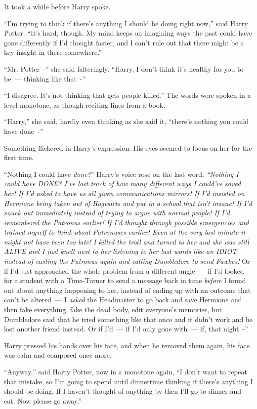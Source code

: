It took a while before Harry spoke.

``I'm trying to think if there's anything I should be doing right now,'' said Harry Potter. ``It's hard, though. My mind keeps on imagining ways the past could have gone differently if I'd thought faster, and I can't rule out that there might be a key insight in there somewhere.''

``Mr. Potter~-'' she said falteringly. ``Harry, I don't think it's healthy for you to be~--- thinking like that~-''

``I disagree. It's not thinking that gets people killed.'' The words were spoken in a level monotone, as though reciting lines from a book.

``Harry,'' she said, hardly even thinking as she said it, ``there's nothing you could have done~-''

Something flickered in Harry's expression. His eyes seemed to focus on her for the first time.

``Nothing I could have \emph{done?}'' Harry's voice rose on the last word. \emph{``Nothing I could have DONE? I've lost track of how many different ways I could've saved her! If I'd asked to have us all given communications mirrors! If I'd insisted on Hermione being taken out of Hogwarts and put in a school that isn't insane! If I'd snuck out immediately instead of trying to argue with normal people! If I'd remembered the Patronus earlier! If I'd thought through possible emergencies and trained myself to think about Patronuses earlier! Even at the very last minute it might not have been too late! I killed the troll and turned to her and she was still ALIVE and I just knelt next to her listening to her last words like an IDIOT instead of casting the Patronus again and calling Dumbledore to send Fawkes!} Or if I'd just approached the whole problem from a different angle~--- if I'd looked for a student with a Time-Turner to send a message back in time \emph{before} I found out about anything happening to her, instead of ending up with an outcome that can't be altered~--- I \emph{asked} the Headmaster to go back and save Hermione and then fake everything, fake the dead body, edit everyone's memories, but Dumbledore said that he tried something like that once and it didn't work and he lost another friend instead. Or if I'd~--- if I'd only gone with~--- if, that night~-''

Harry pressed his hands over his face, and when he removed them again, his face was calm and composed once more.

``Anyway,'' said Harry Potter, now in a monotone again, ``I don't want to repeat that mistake, so I'm going to spend until dinnertime thinking if there's anything I should be doing. If I haven't thought of anything by then I'll go to dinner and eat. Now please go away.''

